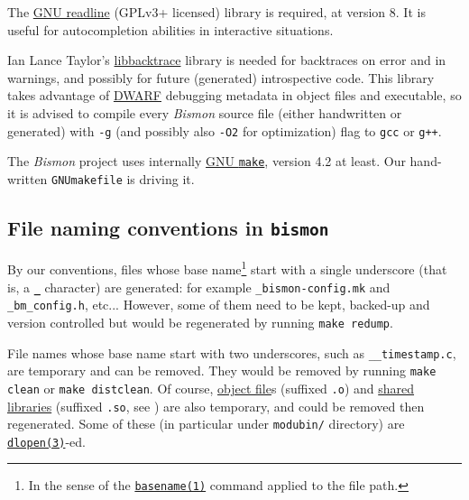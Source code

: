\begin{appendices}
The \href{https://www.gnu.org/software/readline/}{GNU readline}
(GPLv3+ licensed) library is required, at version 8. It is useful for
autocompletion abilities in interactive situations.

Ian Lance Taylor's
\href{https://github.com/ianlancetaylor/libbacktrace}{libbacktrace}
library is needed for backtraces on error and in warnings, and
possibly for future (generated) introspective code. This library takes
advantage of \href{https://en.wikipedia.org/wiki/DWARF}{DWARF}
debugging metadata in object files and executable, so it is advised to
compile every \emph{Bismon} source file (either handwritten or
generated) with \texttt{-g} (and possibly also \texttt{-O2} for
optimization) flag to \texttt{gcc} or \texttt{g++}.


The \emph{Bismon} project  uses internally \href{https://www.gnu.org/software/make/}{GNU \texttt{make}},
  version 4.2 at least. Our hand-written \texttt{GNUmakefile} is
  driving it.
  
\subsection{File naming conventions in \texttt{bismon}}

By our conventions, files  
whose base name\footnote{In the sense of the
\href{https://man7.org/linux/man-pages/man1/basename.1.html}{\texttt{basename(1)}}
command applied to the file path.} start with a single underscore
(that is, a \textbf{\texttt{\_}} character) are generated: for example
\texttt{\_bismon-config.mk} and \texttt{\_bm\_config.h},
etc... However, some of them need to be kept, backed-up and version
controlled but would be regenerated by running
 
 \texttt{make redump}.

File names whose base name start with two underscores, such as
\texttt{\_\_timestamp.c}, are temporary and can be removed. They would
be removed by running \texttt{make clean} or \texttt{make
  distclean}.
 Of course,
\href{https://en.wikipedia.org/wiki/Object_file}{object file}s
(suffixed \texttt{.o}) and
\href{https://en.wikipedia.org/wiki/Library_(computing)#Shared_libraries}{shared
  libraries} (suffixed \texttt{.so}, see
\cite{Drepper:2011:sharedlib}) are also temporary, and could be
removed then regenerated. Some of these (in particular under
\texttt{modubin/} directory) are
\href{https://man7.org/linux/man-pages/man3/dlopen.3.html}{\texttt{dlopen(3)}}-ed.


\end{appendices}
